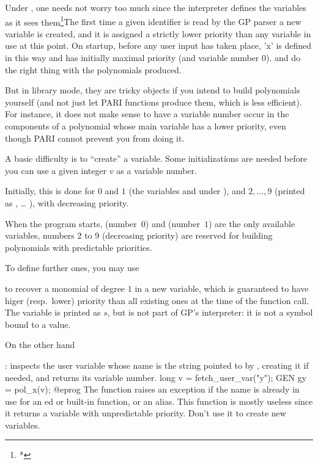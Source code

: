 Under , one needs not worry too much since the interpreter defines
the variables as it sees them\footnote{*}{The first time a given identifier
is read by the GP parser a new variable is created, and it is assigned a
strictly lower priority than any variable in use at this point. On startup,
before any user input has taken place, 'x' is defined in this way and has
initially maximal priority (and variable number $0$).}
%
and do the right thing with the polynomials produced.

But in library mode, they are tricky objects if you intend to build
polynomials yourself (and not just let PARI functions produce them, which is
less efficient). For instance, it does not make sense to have a variable
number occur in the components of a polynomial whose main variable has a
lower priority, even though PARI cannot prevent you from doing it.

 A basic difficulty is to ``create'' a variable.
Some initializations are needed before you can use a given integer $v$ as a
variable number.

Initially, this is done for $0$ and $1$ (the variables  and
 under ), and $2,\dots,9$ (printed as , \dots
{}), with decreasing priority.

 When the program starts,
 (number~$0$) and  (number~$1$) are the only available
variables, numbers $2$ to $9$ (decreasing priority) are reserved for building
polynomials with predictable priorities.

To define further ones, you may use



to recover a monomial of degree $1$ in a new variable, which is guaranteed
to have higer (resp.~lower) priority than all existing ones at the
time of the function call. The variable is printed as $s$, but is not part
of GP's interpreter: it is not a symbol bound to a value.

On the other hand

: inspects the user variable whose name is
the string pointed to by , creating it if needed, and returns its
variable number.
\bprog
long v = fetch_user_var("y");
GEN gy = pol_x(v);
@eprog\noindent
The function raises an exception if the name is already in use for an
ed or built-in function, or an alias. This function
is mostly useless since it returns a variable with unpredictable priority.
Don't use it to create new variables.

